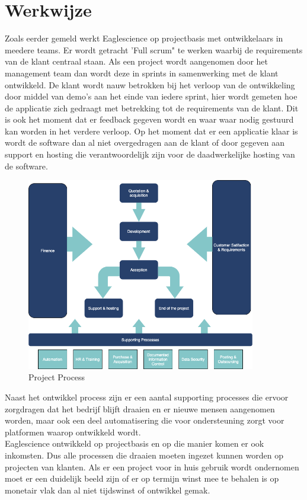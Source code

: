 \section{Werkwijze}
Zoals eerder gemeld werkt Eaglescience op projectbasis met ontwikkelaars in meedere teams. Er wordt getracht 'Full scrum" te werken waarbij de requirements van de klant centraal staan. Als een project wordt aangenomen door het management team dan wordt deze in sprints in samenwerking met de klant ontwikkeld. De klant wordt nauw betrokken bij het verloop van de ontwikkeling door middel van demo's aan het einde van iedere sprint, hier wordt gemeten hoe de applicatie zich gedraagt met betrekking tot de requirements van de klant. Dit is ook het moment dat er feedback gegeven wordt en waar waar nodig gestuurd kan worden in het verdere verloop. Op het moment dat er een applicatie klaar is wordt de software dan al niet overgedragen aan de klant of door gegeven aan support en hosting die verantwoordelijk zijn voor de daadwerkelijke hosting van de software.
\begin{figure}[bth]
\myfloatalign
\includegraphics[width=10cm]{gfx/ProcessFlow}
\caption{Project Process}
\label{fig:Project Process}
\end{figure}
Naast het ontwikkel process zijn er een aantal supporting processes die ervoor zorgdragen dat het bedrijf blijft draaien en er nieuwe mensen aangenomen worden, maar ook een deel automatisering die voor ondersteuning zorgt voor platformen waarop ontwikkeld wordt.\\
Eaglescience ontwikkeld op projectbasis en op die manier komen er ook inkomsten. Dus alle processen die draaien moeten ingezet kunnen worden op projecten van klanten. Als er een project voor in huis gebruik wordt ondernomen moet er een duidelijk beeld zijn of er op termijn winst mee te behalen is op monetair vlak dan al niet tijdswinst of ontwikkel gemak.

